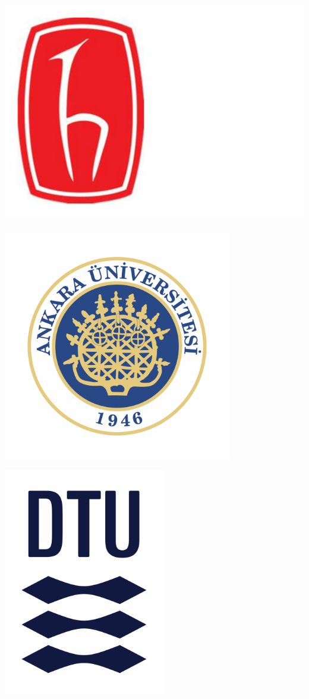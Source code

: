 \documentclass[a0,portrait]{a0poster}
\begin{document}
\noindent
\begin{minipage}{.15\linewidth}
 \includegraphics[height=10cm]{hu.pdf}
\end{minipage}%
\begin{minipage}{.15\linewidth}
 \includegraphics[height=10cm]{au.pdf}
\end{minipage}%
\begin{minipage}{.15\linewidth}
 \includegraphics[height=10cm]{dtu.pdf}
\end{minipage}
\end{document}
